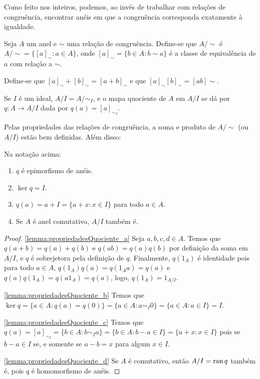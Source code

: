 Como feito nos inteiros, podemos, ao invés de trabalhar com relações de congruência, encontrar anéis em que a congruência corresponda exatamente à igualdade.

\begin{definition}
Seja $A$ um anel e $\sim$ uma relação de congruência. Define-se que $A/\sim$ é $A/\sim=\{[a]_\sim: a \in A\}$, onde $[a]_\sim=\{b\in A: b\sim a\}$ é a classe de equivalência de $a$ com relação a $\sim$.

Define-se que $[a]_\sim+[b]_\sim=[a+b]_\sim$ e que $[a]_\sim[b]_\sim=[ab]\sim$.

Se $I$ é um ideal, $A/I=A/\sim_I$, e o mapa quociente de $A$ em $A/I$ se dá por $q:A\longrightarrow A/I$ dada por $q(a)=[a]_{\sim_I}$.
\end{definition}

Pelas propriedades das relações de congruência, a soma e produto de $A/\sim$ (ou $A/I$) estão bem definidas. Além disso:

\begin{lemma}
    Na notação acima:
    \begin{enumerate}[label=\alph*)]
        \item $q$ é epimorfismo de anéis. \label{lemma:propriedadesQuociente_a}
        \item $\ker q = I$. \label{lemma:propriedadesQuociente_b}
        \item $q(a)=a+I=\{a+x: x \in I\}$ para todo $a \in A$. \label{lemma:propriedadesQuociente_c}
        \item Se $A$ é anel comutativo, $A/I$ também é. \label{lemma:propriedadesQuociente_d}
    \end{enumerate}
\end{lemma}

\begin{proof}
    \ref{lemma:propriedadesQuociente_a} Seja $a, b, c, d \in A$. Temos que $q(a+b)=q(a)+q(b)$ e $q(ab)=q(a)q(b)$ por definição da soma em $A/I$, e $q$ é sobrejetora pela definição de $q$. Finalmente, $q(1_A)$ é identidade pois para todo $a \in A$, $q(1_A)q(a)=q(1_Aa)=q(a)$ e $q(a)q(1_A)=q(a1_A)=q(a)$, logo, $q(1_A)=1_{A/I}$.

    \ref{lemma:propriedadesQuociente_b} Temos que $\ker q=\{a \in A: q(a)=q(0)\}=\{a \in A: a\sim_I 0\}=\{a \in A: a\in I\}=I$.

    \ref{lemma:propriedadesQuociente_c} Temos que $q(a)=[a]_{\sim_I}=\{b \in A: b\sim_I a\}=\{b \in A: b-a\in I\}=\{a+x: x \in I\}$ pois se $b-a \in I$ se, e somente se $a-b=x$ para algum $x \in I$.

    \ref{lemma:propriedadesQuociente_d} Se $A$ é comutativo, então $A/I=\operatorname{ran} q$ também é, pois $q$ é homomorfismo de anéis.
\end{proof}

